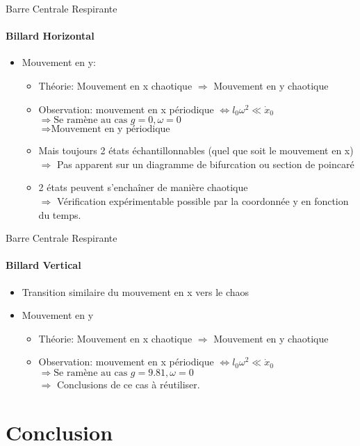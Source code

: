 \documentclass{beamer}
\begin{document}
  \begin{frame}{Barre Centrale Respirante}
  \framesubtitle{Billard Horizontal}
  \begin{itemize}
    \item Mouvement en y:
    \begin{itemize}
      \item Théorie: Mouvement en x chaotique \( \Rightarrow \) Mouvement en y chaotique
      \item Observation: mouvement en x périodique \( \Leftrightarrow l_0 \omega ^ 2 \ll \dot{x}_0 \)\\ \( \Rightarrow \text{Se ramène au cas } g=0, \omega =0\) \\ \( \Rightarrow \text{Mouvement en y périodique} \)
      \item Mais toujours 2 états échantillonnables (quel que soit le mouvement en x)\\\(\Rightarrow\) Pas apparent sur un diagramme de bifurcation ou section de poincaré
      \item 2 états peuvent s'enchaîner de manière chaotique\\\(\Rightarrow\) Vérification expérimentable possible par la coordonnée y en fonction du temps.
    \end{itemize}
  \end{itemize}
  \end{frame}
  
    \begin{frame}{Barre Centrale Respirante}
  \framesubtitle{Billard Vertical}
  \begin{itemize}
    \item Transition similaire du mouvement en x vers le chaos
    \item Mouvement en y
    \begin{itemize}
      \item Théorie: Mouvement en x chaotique \( \Rightarrow \) Mouvement en y chaotique
      \item Observation: mouvement en x périodique \( \Leftrightarrow l_0 \omega ^ 2 \ll \dot{x}_0 \)\\ \( \Rightarrow \text{Se ramène au cas } g=9.81, \omega =0\)\\
      \( \Rightarrow\) Conclusions de ce cas à réutiliser.
    \end{itemize}
  \end{itemize}
  \end{frame}
  
  \section{Conclusion}
  
\end{document}
